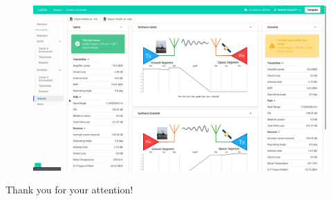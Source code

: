 \documentclass{beamer}
\begin{document}
\begin{frame}
	\begin{figure}
		\includegraphics[width=1\textwidth]{4.png}
	\end{figure}
\end{frame}
\begin{frame}
Thank you for your attention!
\end{frame}
\end{document}
